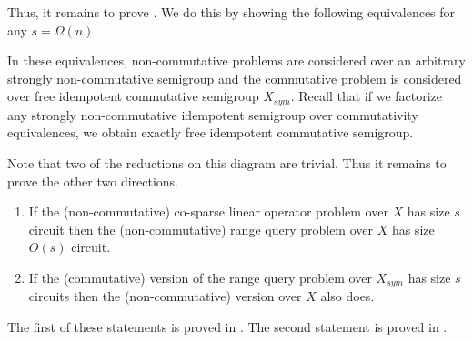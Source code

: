 Thus, it remains to prove . We do this by showing
the following equivalences for any $s = \Omega(n)$.

\vspace{2mm}
\begin{center}
\end{center}
\vspace{2mm}

In these equivalences, non-commutative problems are considered over an arbitrary
strongly non-commutative semigroup and the commutative problem is considered
over free idempotent commutative semigroup $X_{sym}$. Recall that
if we factorize any strongly non-commutative idempotent semigroup over
commutativity equivalences, we obtain exactly free idempotent commutative
semigroup.

Note that two of the reductions on this diagram are trivial. Thus it remains to prove the other two directions.

%
%
%
%
%
%


\begin{enumerate}
	\item If the (non-commutative)
    co-sparse
    linear operator problem over $X$ has size $s$
	circuit then the (non-commutative)
	range query
	problem over $X$ has size
	$O(s)$ circuit.
	\item If the (commutative) version of the
	range query
	problem over $X_{sym}$ has
	size $s$ circuits then the (non-commutative) version over $X$ also does.
\end{enumerate}

The first of these statements is proved in  .
The second statement is proved in .

